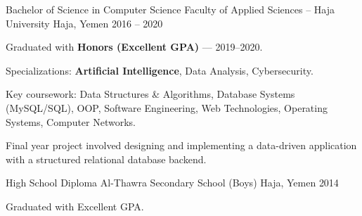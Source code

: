 

\begin{cventries}

  \cventry
    {Bachelor of Science in Computer Science} %
    {Faculty of Applied Sciences -- Haja University} %
    {Haja, Yemen} %
    {2016 -- 2020} %
    {
      \begin{cvitems}
        \item {Graduated with \textbf{Honors (Excellent GPA)} — 2019--2020.}
        \item {Specializations: \textbf{Artificial Intelligence}, Data Analysis, Cybersecurity.}
        \item {Key coursework: Data Structures \& Algorithms, Database Systems (MySQL/SQL), OOP, Software Engineering, Web Technologies, Operating Systems, Computer Networks.}
        \item {Final year project involved designing and implementing a data-driven application with a structured relational database backend.}
      \end{cvitems}
    }

  \cventry
    {High School Diploma} %
    {Al-Thawra Secondary School (Boys)} %
    {Haja, Yemen} %
    {2014} %
    {
      \begin{cvitems}
        \item {Graduated with Excellent GPA.}
      \end{cvitems}
    }

\end{cventries}
